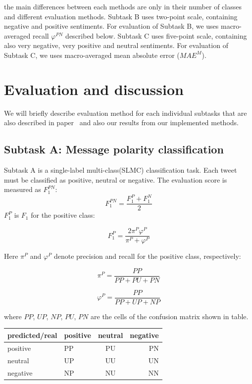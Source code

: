 \documentclass[runningheads,a4paper]{llncs}
\begin{document}
the main differences between each methods are only in their number of classes and different evaluation methods. Subtask B uses two-point scale, containing negative and positive sentiments. For evaluation of Subtask B, we uses macro-averaged recall $\varphi^{PN}$ described below.  Subtask C uses five-point scale, containing also very negative, very positive and neutral sentiments. For evaluation of Subtask C, we uses macro-averaged mean absolute error ($MAE^M$).

\section{Evaluation and discussion}

We will briefly describe evaluation method for each individual subtasks that are also described in paper~\cite{nakov2016semeval} and also our results from our implemented methods.

\subsection{Subtask A: Message polarity classification}
Subtask A is a single-label multi-class(SLMC) classification task. Each tweet must be classified as positive, neutral or negative. The evaluation score is measured as $F^{PN}_1$:
\begin{equation}
F^{PN}_1 = \frac{F^P_1 + F^N_1}{2}
\end{equation}
$F_1^P$ is $F_1$ for the positive class:

\begin{equation}
F^{P}_1 = \frac{2\pi^P\varphi^P}{\pi^P + \varphi^P}
\end{equation}

Here $\pi^P$ and $\varphi^P$ denote precision and recall for the positive class, respectively: 

\begin{equation}
\pi^P = \frac{PP}{PP + PU + PN}
\end{equation}

\begin{equation}
\varphi^P = \frac{PP}{PP + UP + NP}
\end{equation}

where $PP$, $UP$, $NP$, $PU$, $PN$ are the cells of the confusion matrix shown in table. 

\begin{center}
  \begin{tabular}{ | l | l | c | r |}
    \hline
  predicted/real   & positive & neutral & negative \\ \hline
   positive  & PP & PU & PN \\ \hline
   neutral  & UP & UU & UN \\ \hline
   negative  & NP & NU & NN \\
    \hline
  \end{tabular}
\end{center}
\end{document}
